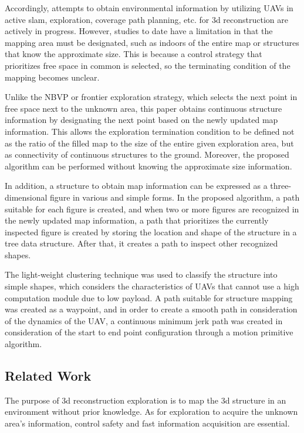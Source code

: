 \documentclass[conference,onecolumn]{IEEEtran} %
\begin{document}
Accordingly, attempts to obtain environmental information by utilizing UAVs in active slam, exploration, coverage path planning, etc. for 3d reconstruction are actively in progress. However, studies to date have a limitation in that the mapping area must be designated, such as indoors of the entire map or structures that know the approximate size. This is because a control strategy that prioritizes free space in common is selected, so the terminating condition of the mapping becomes unclear.

Unlike the NBVP or frontier exploration strategy, which selects the next point in free space next to the unknown area, this paper obtains continuous structure information by designating the next point based on the newly updated map information. This allows the exploration termination condition to be defined not as the ratio of the filled map to the size of the entire given exploration area, but as connectivity of continuous structures to the ground. Moreover, the proposed algorithm can be performed without knowing the approximate size information.

In addition, a structure to obtain map information can be expressed as a three-dimensional figure in various and simple forms. In the proposed algorithm, a path suitable for each figure is created, and when two or more figures are recognized in the newly updated map information, a path that prioritizes the currently inspected figure is created by storing the location and shape of the structure in a tree data structure. After that, it creates a path to inspect other recognized shapes.

The light-weight clustering technique was used to classify the structure into simple shapes, which considers the characteristics of UAVs that cannot use a high computation module due to low payload. A path suitable for structure mapping was created as a waypoint, and in order to create a smooth path in consideration of the dynamics of the UAV, a continuous minimum jerk path was created in consideration of the start to end point configuration through a motion primitive algorithm.


\subsection{Related Work}
The purpose of 3d reconstruction exploration is to map the 3d structure in an environment without prior knowledge. As for exploration to acquire the unknown area's information, control safety and fast information acquisition are essential.
\end{document}
